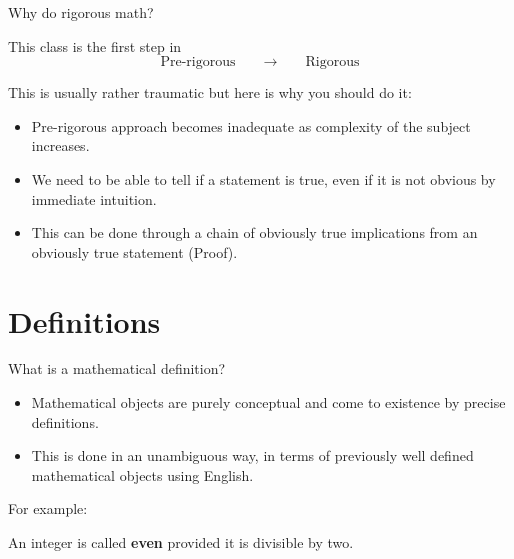\documentclass{beamer}
\begin{document}
\begin{frame}{Why do rigorous math?}
\begin{block}{This class is the first step in}
\[
\textrm{Pre-rigorous}\qquad\to\qquad\textrm{Rigorous}
\]
\end{block}

\vspace{0.3cm}

This is usually rather traumatic but here is why you should do it:\vspace{-0.3cm}
\begin{itemize}
\item Pre-rigorous approach becomes inadequate as complexity of the subject increases.
\item We need to be able to tell if a statement is true, even if it is not obvious by immediate intuition. 
\item This can be done through a chain of obviously true implications from an obviously true statement (\alert{Proof}).
\end{itemize}
\begin{figure}
\end{figure}
\end{frame}


\section{Definitions}

\begin{frame}{What is a mathematical definition?}
\begin{itemize}
\item Mathematical objects are purely conceptual and come to existence by precise definitions.\pause
\item This is done in an unambiguous way, in terms of previously well defined mathematical objects using English.
\end{itemize}\pause

\vspace{0.5cm}
 For example:
\begin{definition}
An integer is called \textbf{even} provided it is divisible by two.
\end{definition}\pause

\vspace{0.5cm}
\end{frame}
\end{document}
